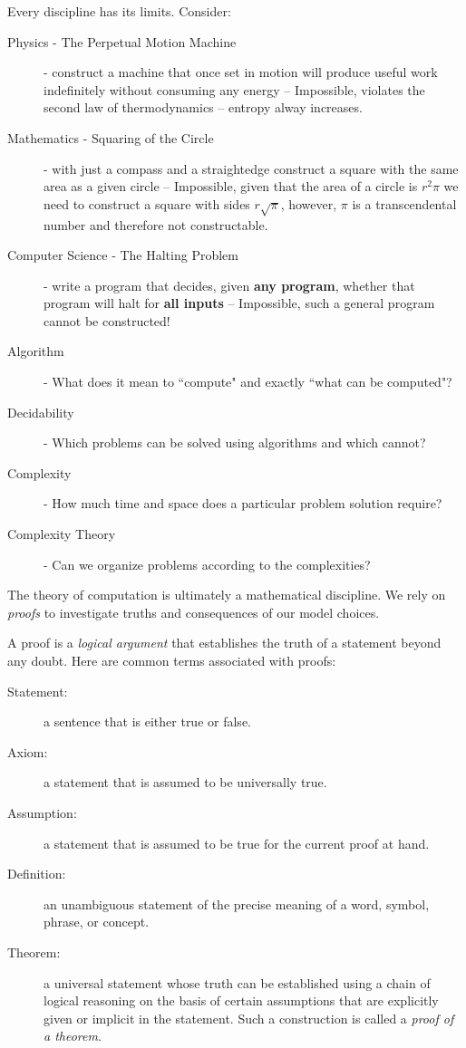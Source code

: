 \documentclass[a4paper,blends,pdf,colorBG,slideColor]{prosper}
\begin{document}
Every discipline has its limits.  Consider:
\begin{description}
\item[Physics - The Perpetual Motion Machine] - construct a machine that once set in motion
will produce useful work indefinitely without consuming any energy -- Impossible, violates
the second law of thermodynamics -- entropy alway increases.
\item[Mathematics - Squaring of the Circle] - with just a compass and a straightedge construct
a square with the same area as a given circle -- Impossible, given that the area of a circle is $r^2 \pi$
we need to construct a square with sides $r \sqrt{\pi}$, however, $\pi$ is a transcendental  number
and therefore not constructable.
\item[Computer Science - The Halting Problem] - write a program that decides, given {\bf any program}, whether
that program will halt for {\bf all inputs} -- Impossible, such a general program cannot be constructed!
\end{description}

\es



\begin{description}
\item[Algorithm] - What does it mean to ``compute" and exactly ``what can be computed"?
\item[Decidability] - Which problems can be solved using algorithms and which cannot?
\item[Complexity] - How much time and space does a particular problem solution require?
\item[Complexity Theory] - Can we organize problems according to the complexities?
\end{description}
\es

The theory of computation is ultimately a mathematical discipline.  We rely on {\em proofs} to investigate
truths and consequences of our model choices.

A proof is a {\em logical argument} that establishes the truth of a statement beyond any doubt.  Here are
common terms associated with proofs:

\begin{description}
\item[Statement:] a sentence that is either true or false.
\item[Axiom:] a statement that is assumed to be universally true.
\item[Assumption:] a statement that is assumed to be true for the current proof at hand.
\item[Definition:] an unambiguous statement of the precise meaning of a word, symbol, phrase, or
concept.
\item[Theorem:] a universal statement whose truth can be established using a chain of logical reasoning on the basis of certain assumptions that are explicitly given or implicit in the statement.  Such a construction
is called a {\em proof of a theorem}.
\end{description}
\es
\end{document}

